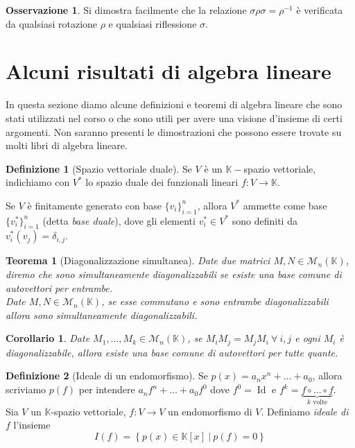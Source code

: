 \documentclass[11pt]{article}
\theoremstyle{plain}
\newtheorem{thm}{Teorema}[section]
\newtheorem*{cor}{Corollario}
\theoremstyle{definition}
\newtheorem{defn}{Definizione}[section]
\newtheorem*{rem}{Osservazione}
\theoremstyle{remark}
\newcommand{\K}{\mathbb{K}}
\newcommand{\matrices}{\mathcal{M}}
\DeclareMathOperator{\Id}{Id}
\begin{document}
\begin{rem}
 Si dimostra facilmente che la relazione $\sigma\rho\sigma=\rho^{-1}$ è verificata da qualsiasi rotazione $\rho$
 e qualsiasi riflessione $\sigma$.
\end{rem}











\newpage
\section{Alcuni risultati di algebra lineare}
In questa sezione diamo alcune definizioni e teoremi di algebra lineare che sono stati utilizzati nel corso o che sono utili per avere una visione d'insieme di certi argomenti. Non saranno presenti le dimostrazioni che possono essere trovate su molti libri di algebra lineare.
\begin{defn}[Spazio vettoriale duale]
Se $V$ è un $\K-$spazio vettoriale, indichiamo con $V^*$ lo spazio duale dei funzionali lineari $f:V\to\K$.

Se $V$ è finitamente generato con base $\{v_i\}_{i=1}^n$, allora $V^*$ ammette come base $\{v_i^*\}_{i=1}^n$ (detta \emph{base duale}), dove gli elementi $v_i^*\in V^*$
sono definiti da $v_i^*(v_j) = \delta_{i,j}$.
\end{defn}

\begin{thm}[Diagonalizzazione simultanea]
\label{thm:diag_sim}
	Date due matrici $M, N\in \matrices_n(\K)$, diremo che sono \emph{simultaneamente diagonalizzabili} se esiste una base comune di autovettori per entrambe.\\
	Date $M, N\in \matrices_n(\K)$, se esse commutano e sono entrambe diagonalizzabili allora sono simultaneamente diagonalizzabili.
\end{thm}
\begin{cor}
	Date $M_1,\ldots,M_k \in \matrices_n(\K)$, se $M_iM_j=M_jM_i\ \forall\ i, j$ e ogni $M_i$ è diagonalizzabile, allora esiste una base comune di autovettori per tutte quante.
\end{cor}


\begin{defn}[Ideale di un endomorfismo]
	Se $p(x)=a_n x^n+\ldots+a_0$, allora scriviamo $p(f)$ per intendere $a_nf^n+\ldots+a_0f^0$ dove $f^0=\Id$ e $f^k=\underbrace{f\circ\ldots\circ f}_{k \text{ volte}}$.\\
	Sia $V$ un $\K$-spazio vettoriale, $f:V\to V$ un endomorfismo di $V$. Definiamo \textit{ideale di $f$} l'insieme
	\[I(f)=\left\{ p(x)\in \K[x]\ |\ p(f)=0 \right\}\]
\end{defn}
\end{document}
